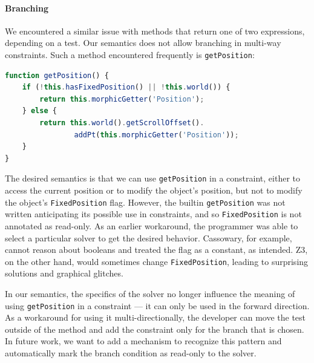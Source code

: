 \documentclass[10pt,reprint]{sigplanconf-preprint}
\begin{document}
\paragraph{Branching }
\label{sec:branching}
We encountered a similar issue with methods that return one of two
expressions, depending on a test. Our semantics does not allow
branching in multi-way constraints. Such a method encountered frequently is
\verb!getPosition!:
\begin{lstlisting}[language=JavaScript,caption={~},label=lst:getPosition]
function getPosition() {
    if (!this.hasFixedPosition() || !this.world()) {
        return this.morphicGetter('Position');
    } else {
        return this.world().getScrollOffset().
                addPt(this.morphicGetter('Position'));
    }
}
\end{lstlisting}
The desired semantics is that we can use \verb!getPosition! in a
constraint, either to access the current position or to modify the
object's position, but not to modify the object's \verb!FixedPosition!
flag.  However, the builtin \verb!getPosition! was not written
anticipating its possible use in constraints, and so
\verb!FixedPosition! is not annotated as read-only.  As an earlier
workaround, the programmer was able to select a particular solver to
get the desired behavior. Cassowary, for example, cannot reason about
booleans and treated the flag as a constant, as intended. Z3, on the
other hand, would sometimes change \verb!FixedPosition!, leading to
surprising solutions and graphical glitches.

In our semantics, the specifics of the solver no longer influence the
meaning of using \verb!getPosition! in a constraint --- it can only be
used in the forward direction.  As a workaround for using it
multi-directionally, the developer can move the test outside of the
method and add the constraint only for the branch that is chosen. In
future work, we want to add a mechanism to recognize this pattern and
automatically mark the branch condition as read-only to the solver.
\end{document}
